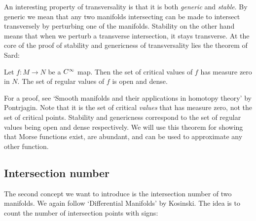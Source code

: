 An interesting property of transversality is that it is both \emph{generic} and \emph{stable}.
By generic we mean that any two manifolds intersecting can be made to intersect transversely by perturbing one of the manifolds.
Stability on the other hand means that when we perturb a transverse intersection, it stays transverse.
At the core of the proof of stability and genericness of transversality lies the theorem of Sard:
\begin{theorem}
    Let $f: M \to  N$ be a $C^\infty$ map. Then the set of critical values of  $f$ has measure zero in $N$.
    The set of regular values of $f$ is open and dense.
\end{theorem}
For a proof, see `Smooth manifolds and their applications in homotopy theory' by Pontrjagin.
Note that it is the set of critical \emph{values} that has measure zero, not the set of critical points. 
Stability and genericness correspond to the set of regular values being open and dense respectively.
We will use this theorem for showing that Morse functions exist, are abundant, and can be used to approximate any other function.

\filbreak
\subsection*{Intersection number}

The second concept we want to introduce is the intersection number of two manifolds.
We again follow `Differential Manifolds' by Kosinski.
The idea is to count the number of intersection points with signs:

